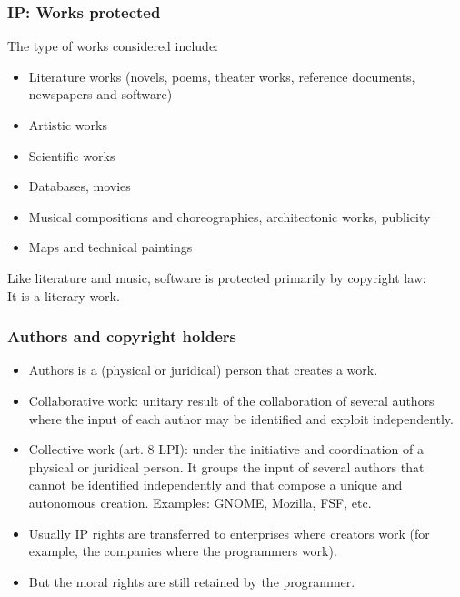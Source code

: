 
\begin{frame}
\frametitle{IP: Works protected}

The type of works considered include:

\begin{itemize}
\item Literature works (novels, poems, theater works, reference documents, newspapers and software)
\item Artistic works 
\item Scientific works 
\item Databases, movies 
\item Musical compositions and choreographies, architectonic works, publicity 
\item Maps and technical paintings
\end{itemize}

\begin{center}
\footnotesize
Like literature and music, \alert{software} is protected primarily by copyright law: \\ It is a \alert{literary work}.
\end{center}

\end{frame}



\begin{frame}
\frametitle{Authors and copyright holders}

\begin{itemize}

\item Authors is a (physical or juridical) person that creates
a work. 

\item \alert{Collaborative work}: unitary result of the collaboration
of several authors where the input of each author may be
identified and exploit independently.
\item \alert{Collective work} (art. 8 LPI): under the initiative and coordination of
a physical or juridical person. It groups the input
of several authors that cannot be identified independently
and that compose a unique and autonomous creation. {\footnotesize Examples: GNOME,
Mozilla, FSF, etc.}
\item Usually IP rights are transferred to enterprises where creators
work (for example, the companies where the programmers work). 
\item But the moral rights are still retained by the programmer.


\end{itemize}

\end{frame}


